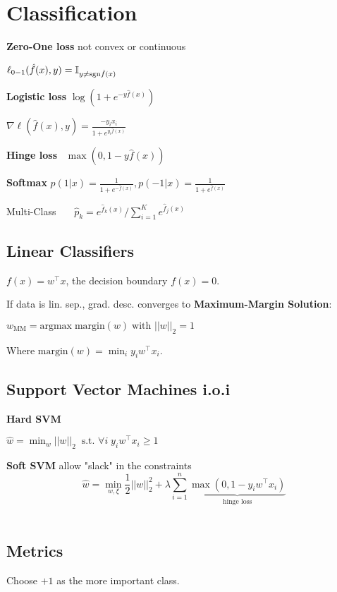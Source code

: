 \section*{Classification}

\textbf{Zero-One loss} \quad not convex or continuous

\qquad \qquad $\ell_{0-1}(\hat{f}(x), y) = \mathbb{I}_{y \neq \text{sgn} \hat{f}(x)}$

\textbf{Logistic loss} \quad $\log(1 + e^{-y \hat{f}(x)})$

\qquad \qquad $\nabla \ell(\hat{f}(x), y) = \frac{-y_i x_i}{1 + e^{y_i \hat{f}(x)}}$

\textbf{Hinge loss} \quad \ $\max(0, 1-y \hat{f}(x))$

\textbf{Softmax} $p(1 | x) = \frac{1}{1 + e^{- \hat{f}(x)}}, p(-1 | x) = \frac{1}{1 + e^{\hat{f}(x)}}$ 

Multi-Class \ \ \ $\hat{p}_k = e^{\hat{f}_k(x)} / \sum_{i=1}^K e^{\hat{f}_j(x)}$

\subsection*{Linear Classifiers}

$f(x) = w^\top x$, the decision boundary $f(x) = 0$. \smallskip

If data is lin. sep., grad. desc. converges to \textbf{Maximum-Margin Solution}: 

\quad $w_\text{MM} = \text{argmax} \; \text{margin} (w) \; \text{with } ||w||_2 = 1$

Where $\text{margin} (w) = \min_i y_i w^\top x_i$.
 
\subsection*{Support Vector Machines i.o.i}
\textbf{Hard SVM}

\qquad $\hat{w} = \min_w ||w||_2 \; \; \text{s.t. } \forall i \;y_i w^\top x_i \geq 1$
 
\textbf{Soft SVM} \quad allow "slack" in the constraints
$$\hat{w} = \min_{w, \xi} \frac{1}{2} ||w||_2^2 + \lambda \sum_{i=1}^n \underbrace{\max (0, 1 - y_i w^\top x_i)}_{\text{hinge loss}}$$ \\[-20pt]

\subsection*{Metrics} 
Choose $+1$ as the more important class. 

